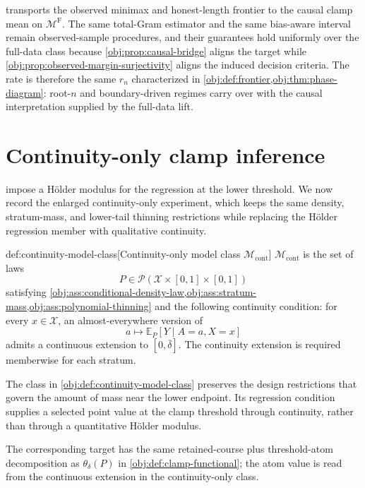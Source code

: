 \documentclass[11pt]{article}
\begin{document}
 transports the observed minimax and honest-length frontier to the causal clamp mean on \(\mathcal M^{\mathrm F}\). The same total-Gram estimator and the same bias-aware interval remain observed-sample procedures, and their guarantees hold uniformly over the full-data class because \cref{obj:prop:causal-bridge} aligns the target while \cref{obj:prop:observed-margin-surjectivity} aligns the induced decision criteria. The rate is therefore the same \(r_n\) characterized in \cref{obj:def:frontier,obj:thm:phase-diagram}: root-\(n\) and boundary-driven regimes carry over with the causal interpretation supplied by the full-data lift.


\section{Continuity-only clamp inference}
\label{sec:continuity-only}

 impose a Hölder modulus for the regression at the lower threshold. We now record the enlarged continuity-only experiment, which keeps the same density, stratum-mass, and lower-tail thinning restrictions while replacing the Hölder regression member with qualitative continuity.

\begin{definitionv}{def:continuity-model-class}[Continuity-only model class \(\mathcal M_{\mathrm{cont}}\)]
\(\mathcal M_{\mathrm{cont}}\) is the set of laws
\[
P\in\mathcal P(\mathcal X\times[0,1]\times[0,1])
\]
satisfying \cref{obj:ass:conditional-density-law,obj:ass:stratum-mass,obj:ass:polynomial-thinning} and the following continuity condition: for every \(x\in\mathcal X\), an almost-everywhere version of
\[
a\mapsto \mathbb E_P[Y\mid A=a,X=x]
\]
admits a continuous extension to \([0,\bar\delta]\). The continuity extension is required memberwise for each stratum.
\end{definitionv}

The class in \cref{obj:def:continuity-model-class} preserves the design restrictions that govern the amount of mass near the lower endpoint. Its regression condition supplies a selected point value at the clamp threshold through continuity, rather than through a quantitative Hölder modulus.

The corresponding target has the same retained-course plus threshold-atom decomposition as \(\theta_\delta(P)\) in \cref{obj:def:clamp-functional}; the atom value is read from the continuous extension in the continuity-only class.
\end{document}
